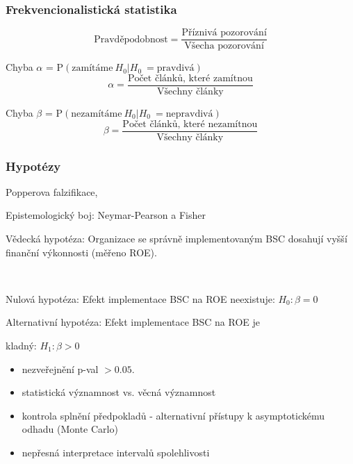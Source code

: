 \documentclass[10pt,xcolor={dvipsnames}]{beamer}
\begin{document}

\begin{frame}[fragile]
\frametitle{Frekvencionalistická statistika}
\begin{large}
\[\text{Pravděpodobnost} = \frac{\text{Příznivá pozorování}}{\text{Všecha pozorování}}\]\bigskip

\textcolor{WildStrawberry}{Chyba $\alpha$ = $\text{P}\left(\text{zamítáme}\ H_0 | H_0\ =\text{pravdivá} \right)$\bigskip
\[\alpha = \frac{\text{Počet článků, které zamítnou}}{\text{Všechny články}}\]}

\textcolor{NavyBlue}{Chyba $\beta$ = $\text{P}\left(\text{nezamítáme}\ H_0 | H_0\ =\text{nepravdivá} \right)$\bigskip
\[\beta = \frac{\text{Počet článků, které nezamítnou}}{\text{Všechny články}}\]}

\end{large}
\end{frame}


\begin{frame}
\frametitle{Hypotézy}
\begin{large}
\begin{itemize}
\item[--] Popperova falzifikace,
\item[--] Epistemologický boj: Neymar-Pearson a Fisher \\
\textcolor{WildStrawberry}{\item[--] Vědecká hypotéza: Organizace se správně implementovaným BSC dosahují vyšší finanční výkonnosti (měřeno ROE).}\\
\textcolor{NavyBlue}{\item[--] Nulová hypotéza: Efekt implementace BSC na ROE neexistuje: $H_0: \beta = 0$ } 
\textcolor{NavyBlue}{\item[--] Alternativní hypotéza: Efekt implementace BSC na ROE je }\textcolor{WildStrawberry}{kladný}\textcolor{NavyBlue}{: $H_1: \beta > 0$ } 
\end{itemize}
\end{large}
\end{frame}



\begin{frame}
\begin{large}

\begin{itemize}
\item[--] nezveřejnění p-val $>0.05$.
\item[--] statistická významnost vs. věcná významnost
\item[--] kontrola splnění předpokladů - alternativní přístupy k asymptotickému odhadu (Monte Carlo)
\item[--] nepřesná interpretace intervalů spolehlivosti
\end{itemize}
\end{large}
\end{frame}
\end{document}
